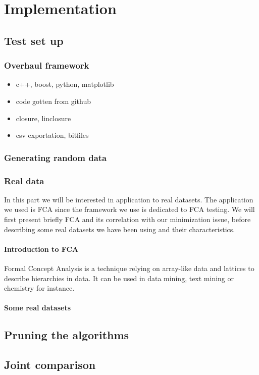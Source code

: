 \chapter{Implementation}



\section{Test set up}

\subsection{Overhaul framework}

\begin{itemize}
	\item c++, boost, python, matplotlib
	\item code gotten from github
	\item closure, linclosure
	\item csv exportation, bitfiles
\end{itemize}

\subsection{Generating random data}

\subsection{Real data}

In this part we will be interested in application to real datasets. The application we used is FCA since the framework we use is dedicated to FCA
testing. We will first present briefly FCA and its correlation with our
minimization issue, before describing some real datasets we have been using
and their characteristics.

\subsubsection{Introduction to FCA}

Formal Concept Analysis is a technique relying on array-like data and lattices
to describe hierarchies in data. It can be used in data mining, text mining or
chemistry for instance.

\subsubsection{Some real datasets}

\section{Pruning the algorithms}

\section{Joint comparison}